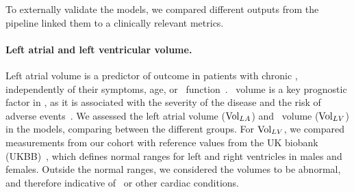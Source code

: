 To externally validate the models, 
we compared different outputs from the pipeline %
linked them to a clinically relevant metrics.

\paragraph{Left atrial and left ventricular volume.} 
Left atrial volume is a predictor of outcome in patients with chronic \HF, 
independently of their symptoms, age, or \LV\ function~\cite{rossi-2007-lav}. 
\LV\ volume is a key prognostic factor in \HF, 
as it is associated with the severity of the disease and the risk of 
adverse events~\cite{kasa-2024-lv_volume,ito-2021-lv_volume}.
We assessed the left atrial volume ($\mathrm{Vol}_{LA}$) and \LV\ volume ($\mathrm{Vol}_{LV}$) in the models, 
comparing between the different groups.
For $\mathrm{Vol}_{LV}$, we compared measurements from our cohort with reference values from the UK biobank 
(UKBB)~\cite{petersen-2017-reference}, which defines normal ranges for left and right ventricles
in males and females. 
Outside the normal ranges, we considered the volumes to be abnormal,
and therefore indicative of \HF\ or other cardiac conditions. 




% 